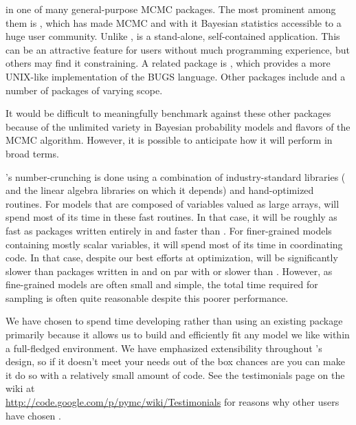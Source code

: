 \documentclass[]{jss}
\begin{document}
 in one of many general-purpose MCMC packages. The most prominent among them is  \citep{winbugs}, which has made MCMC and with it Bayesian statistics accessible to a huge user community. Unlike ,  is a stand-alone, self-contained application. This can be an attractive feature for users without much programming experience, but others may find it constraining. A related package is  \citep{jags}, which provides a more UNIX-like implementation of the BUGS language. Other packages include  \citep{hbc} and a number of  \citep{r}  packages of varying scope.

It would be difficult to meaningfully benchmark  against these other packages because of the unlimited variety in Bayesian probability models and flavors of the MCMC algorithm. However, it is possible to anticipate how it will perform in broad terms.

's number-crunching is done using a combination of industry-standard libraries ( \citep{numpy}  and the linear algebra libraries on which it depends) and hand-optimized  routines. For models that are composed of variables valued as large arrays,  will spend most of its time in these fast routines. In that case, it will be roughly as fast as packages written entirely in  and faster than . For finer-grained models containing mostly scalar variables, it will spend most of its time in coordinating  code. In that case, despite our best efforts at optimization,  will be significantly slower than packages written in  and on par with or slower than . However, as fine-grained models are often small and simple, the total time required for sampling is often quite reasonable despite this poorer performance.

We have chosen to spend time developing  rather than using an existing package primarily because it allows us to build and efficiently fit any model we like within a full-fledged  environment. We have emphasized extensibility throughout 's design, so if it doesn't meet your needs out of the box chances are you can make it do so with a relatively small amount of code. See the testimonials page on the wiki at \\
\href{http://code.google.com/p/pymc/wiki/Testimonials}{http://code.google.com/p/pymc/wiki/Testimonials} for reasons why other users have chosen .
\end{document}
